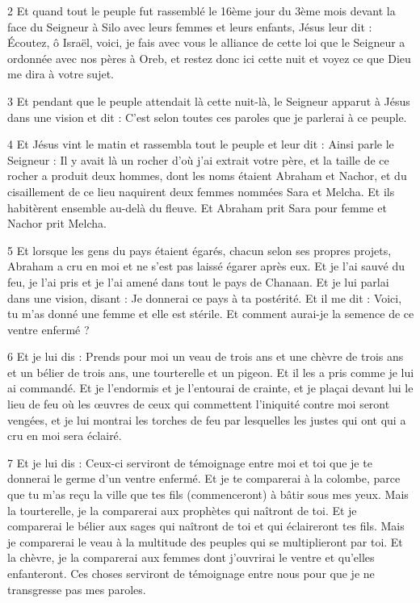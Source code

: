 \par 2 Et quand tout le peuple fut rassemblé le 16ème jour du 3ème mois devant la face du Seigneur à Silo avec leurs femmes et leurs enfants, Jésus leur dit : Écoutez, ô Israël, voici, je fais avec vous le alliance de cette loi que le Seigneur a ordonnée avec nos pères à Oreb, et restez donc ici cette nuit et voyez ce que Dieu me dira à votre sujet.

\par 3 Et pendant que le peuple attendait là cette nuit-là, le Seigneur apparut à Jésus dans une vision et dit : C'est selon toutes ces paroles que je parlerai à ce peuple.

\par 4 Et Jésus vint le matin et rassembla tout le peuple et leur dit : Ainsi parle le Seigneur : Il y avait là un rocher d'où j'ai extrait votre père, et la taille de ce rocher a produit deux hommes, dont les noms étaient Abraham et Nachor, et du cisaillement de ce lieu naquirent deux femmes nommées Sara et Melcha. Et ils habitèrent ensemble au-delà du fleuve. Et Abraham prit Sara pour femme et Nachor prit Melcha.

\par 5 Et lorsque les gens du pays étaient égarés, chacun selon ses propres projets, Abraham a cru en moi et ne s'est pas laissé égarer après eux. Et je l'ai sauvé du feu, je l'ai pris et je l'ai amené dans tout le pays de Chanaan. Et je lui parlai dans une vision, disant : Je donnerai ce pays à ta postérité. Et il me dit : Voici, tu m'as donné une femme et elle est stérile. Et comment aurai-je la semence de ce ventre enfermé ?

\par 6 Et je lui dis : Prends pour moi un veau de trois ans et une chèvre de trois ans et un bélier de trois ans, une tourterelle et un pigeon. Et il les a pris comme je lui ai commandé. Et je l'endormis et je l'entourai de crainte, et je plaçai devant lui le lieu de feu où les œuvres de ceux qui commettent l'iniquité contre moi seront vengées, et je lui montrai les torches de feu par lesquelles les justes qui ont qui a cru en moi sera éclairé.

\par 7 Et je lui dis : Ceux-ci serviront de témoignage entre moi et toi que je te donnerai le germe d'un ventre enfermé. Et je te comparerai à la colombe, parce que tu m'as reçu la ville que tes fils (commenceront) à bâtir sous mes yeux. Mais la tourterelle, je la comparerai aux prophètes qui naîtront de toi. Et je comparerai le bélier aux sages qui naîtront de toi et qui éclaireront tes fils. Mais je comparerai le veau à la multitude des peuples qui se multiplieront par toi. Et la chèvre, je la comparerai aux femmes dont j'ouvrirai le ventre et qu'elles enfanteront. Ces choses serviront de témoignage entre nous pour que je ne transgresse pas mes paroles.


